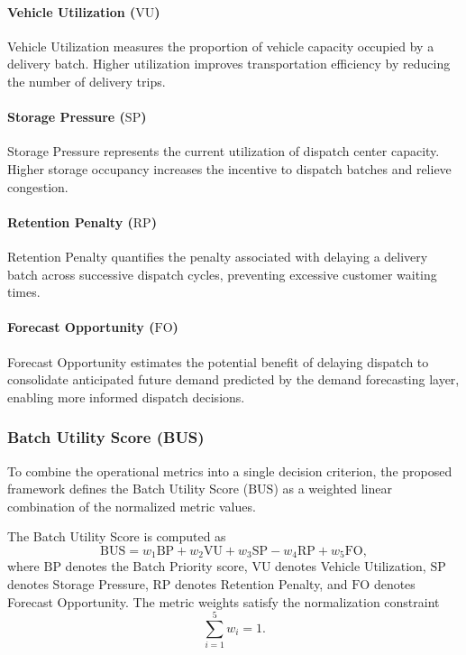 \documentclass{article}
\begin{document}
\paragraph{Vehicle Utilization ($\mathrm{VU}$)}
Vehicle Utilization measures the proportion of vehicle capacity occupied by a delivery batch. Higher utilization improves transportation efficiency by reducing the number of delivery trips.

\paragraph{Storage Pressure ($\mathrm{SP}$)}
Storage Pressure represents the current utilization of dispatch center capacity. Higher storage occupancy increases the incentive to dispatch batches and relieve congestion.

\paragraph{Retention Penalty ($\mathrm{RP}$)}
Retention Penalty quantifies the penalty associated with delaying a delivery batch across successive dispatch cycles, preventing excessive customer waiting times.

\paragraph{Forecast Opportunity ($\mathrm{FO}$)}
Forecast Opportunity estimates the potential benefit of delaying dispatch to consolidate anticipated future demand predicted by the demand forecasting layer, enabling more informed dispatch decisions.


\subsubsection{Batch Utility Score (BUS)}
\label{subsubsec:batch_utility_score}

To combine the operational metrics into a single decision criterion, the proposed framework defines the Batch Utility Score ($\mathrm{BUS}$) as a weighted linear combination of the normalized metric values.

The Batch Utility Score is computed as
\begin{equation}
\mathrm{BUS} = w_1 \mathrm{BP} + w_2 \mathrm{VU} + w_3 \mathrm{SP} - w_4 \mathrm{RP} + w_5 \mathrm{FO},
\end{equation}
where $\mathrm{BP}$ denotes the Batch Priority score, $\mathrm{VU}$ denotes Vehicle Utilization, $\mathrm{SP}$ denotes Storage Pressure, $\mathrm{RP}$ denotes Retention Penalty, and $\mathrm{FO}$ denotes Forecast Opportunity. The metric weights satisfy the normalization constraint
\begin{equation}
\sum_{i=1}^{5} w_i = 1.
\end{equation}
\end{document}

